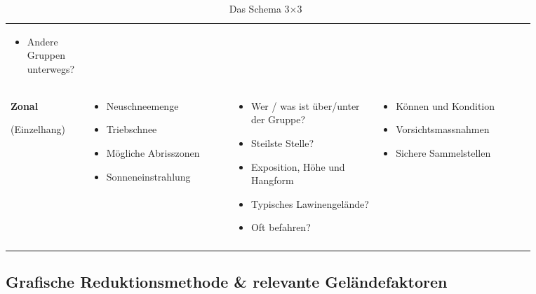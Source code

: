 \begin{landscape}
\begin{table}[hb]
\begin{tabular}{|p{0.1\linewidth} | p{0.25\linewidth} | p{0.25\linewidth} | p{0.27\linewidth} |}
\begin{itemize}[noitemsep, topsep=0pt]
      \item Andere Gruppen unterwegs?
  \end{itemize} 
  \\ 
  \hhline{|----|}
  \textbf{Zonal} \par (Einzelhang) &  
  \begin{itemize}[noitemsep, topsep=0pt]
      \item Neuschneemenge
      \item Triebschnee
      \item Mögliche Abrisszonen
      \item Sonneneinstrahlung
  \end{itemize} 
  &  
  \begin{itemize}[noitemsep, topsep=0pt]
      \item Wer / was ist über/unter der Gruppe?
      \item Steilste Stelle?
      \item Exposition, Höhe und Hangform
      \item Typisches Lawinengelände?
      \item Oft befahren?
  \end{itemize} 
  &  
  \begin{itemize}[noitemsep, topsep=0pt]
      \item Können und Kondition
      \item Vorsichtsmassnahmen
      \item Sichere Sammelstellen
  \end{itemize} 
  \\ 
  \hhline{|----|}
\end{tabular}

  \renewcommand{\arraystretch}{1}
  \caption{Das Schema 3$\times$3~\cite{munter}}\label{tab:3x3table}
\end{table}
\end{landscape}


\pagebreak
\subsection{Grafische Reduktionsmethode \& relevante Geländefaktoren}


